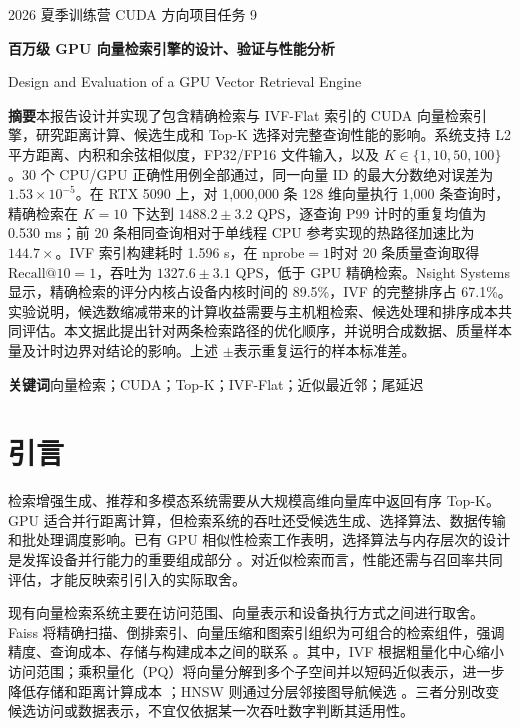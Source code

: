 \documentclass[UTF8,a4paper,zihao=5,fontset=none]{ctexart}
\begin{document}
\thispagestyle{empty}
\begin{center}
{\small 2026 夏季训练营 CUDA 方向项目\quad 任务 9}\par
\vspace{11pt}
{\LARGE\bfseries 百万级 GPU 向量检索引擎的设计、验证与性能分析\par}
\vspace{8pt}
{\normalsize Design and Evaluation of a GPU Vector Retrieval Engine\par}
\end{center}
\vspace{4pt}
\noindent\textbf{摘\quad 要}\quad 本报告设计并实现了包含精确检索与 IVF-Flat 索引的 CUDA 向量检索引擎，研究距离计算、候选生成和 Top-K 选择对完整查询性能的影响。系统支持 L2 平方距离、内积和余弦相似度，FP32/FP16 文件输入，以及 $K\in\{1,10,50,100\}$。30 个 CPU/GPU 正确性用例全部通过，同一向量 ID 的最大分数绝对误差为$1.53\times10^{-5}$。在 RTX 5090 上，对 1,000,000 条 128 维向量执行 1,000 条查询时，精确检索在 $K=10$ 下达到 $1488.2\pm3.2$ QPS，逐查询 P99 计时的重复均值为 0.530 ms；前 20 条相同查询相对于单线程 CPU 参考实现的热路径加速比为 $144.7\times$。IVF 索引构建耗时 1.596 s，在 $\mathrm{nprobe}=1$时对 20 条质量查询取得 $\mathrm{Recall@10}=1$，吞吐为 $1327.6\pm3.1$ QPS，低于 GPU 精确检索。Nsight Systems 显示，精确检索的评分内核占设备内核时间的 89.5\%，IVF 的完整排序占 67.1\%。实验说明，候选数缩减带来的计算收益需要与主机粗检索、候选处理和排序成本共同评估。本文据此提出针对两条检索路径的优化顺序，并说明合成数据、质量样本量及计时边界对结论的影响。上述 $\pm$表示重复运行的样本标准差。\par
\vspace{5pt}
\noindent\textbf{关键词}\quad  向量检索；CUDA；Top-K；IVF-Flat；近似最近邻；尾延迟\par
\vspace{6pt}
\section{引言}

检索增强生成、推荐和多模态系统需要从大规模高维向量库中返回有序 Top-K。GPU 适合并行距离计算，但检索系统的吞吐还受候选生成、选择算法、数据传输和批处理调度影响。已有 GPU 相似性检索工作表明，选择算法与内存层次的设计是发挥设备并行能力的重要组成部分 \cite{r1}。对近似检索而言，性能还需与召回率共同评估，才能反映索引引入的实际取舍。


现有向量检索系统主要在访问范围、向量表示和设备执行方式之间进行取舍。Faiss 将精确扫描、倒排索引、向量压缩和图索引组织为可组合的检索组件，强调精度、查询成本、存储与构建成本之间的联系 \cite{r2}。其中，IVF 根据粗量化中心缩小访问范围；乘积量化（PQ）将向量分解到多个子空间并以短码近似表示，进一步降低存储和距离计算成本 \cite{r3}；HNSW 则通过分层邻接图导航候选 \cite{r4}。三者分别改变候选访问或数据表示，不宜仅依据某一次吞吐数字判断其适用性。
\end{document}
